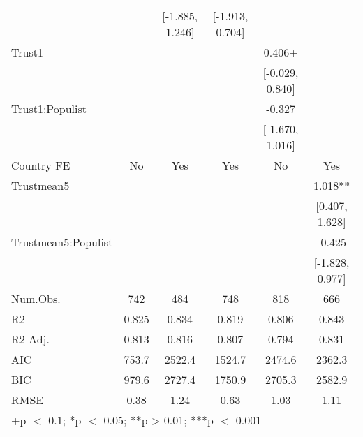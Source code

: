 \begin{table}
\begin{tabular}[t]{lccccc}
 &  & {}[-1.885, 1.246] & {}[-1.913, 0.704] &  & \\
Trust1 &  &  &  & 0.406+ & \\
 &  &  &  & {}[-0.029, 0.840] & \\
Trust1:Populist &  &  &  & -0.327 & \\
 &  &  &  & {}[-1.670, 1.016] & \\
Country FE & No & Yes & Yes & No & Yes\\
Trustmean5 &  &  &  &  & 1.018**\\
 &  &  &  &  & {}[0.407, 1.628]\\
Trustmean5:Populist &  &  &  &  & -0.425\\
 &  &  &  &  & {}[-1.828, 0.977]\\
\midrule
Num.Obs. & 742 & 484 & 748 & 818 & 666\\
R2 & 0.825 & 0.834 & 0.819 & 0.806 & 0.843\\
R2 Adj. & 0.813 & 0.816 & 0.807 & 0.794 & 0.831\\
AIC & 753.7 & 2522.4 & 1524.7 & 2474.6 & 2362.3\\
BIC & 979.6 & 2727.4 & 1750.9 & 2705.3 & 2582.9\\
RMSE & 0.38 & 1.24 & 0.63 & 1.03 & 1.11\\
\bottomrule
\multicolumn{6}{l}{\rule{0pt}{1em}+p $<$ 0.1; *p $<$ 0.05; **p > 0.01; ***p $<$ 0.001}\\
\end{tabular}
\end{table}
